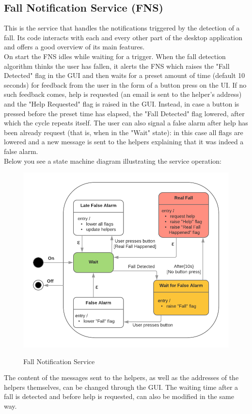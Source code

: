 \documentclass[hidelinks,conference,12pt]{IEEETran}
\begin{document}
\subsection{Fall Notification Service (FNS)}
This is the service that handles the notifications triggered by the detection of a fall. Its code interacts with each and every other part of the desktop application and offers a good overview of its main features.\\
On start the FNS idles while waiting for a trigger. When the fall detection algorithm thinks the user has fallen, it alerts the FNS which raises the "Fall Detected" flag in the GUI and then waits for a preset amount of time (default 10 seconds) for feedback from the user in the form of a button press on the UI. If no such feedback comes, help is requested (an email is sent to the helper’s address) and the "Help Requested" flag is raised in the GUI. Instead, in case a button is pressed before the preset time has elapsed, the "Fall Detected" flag lowered, after which the cycle repeats itself. The user can also signal a false alarm after help has been already request (that is, when in the "Wait" state): in this case all flags are lowered and a new message is sent to the helpers explaining that it was indeed a false alarm.\\
Below you see a state machine diagram illustrating the service operation:
\FloatBarrier
\begin{figure}[!h]
	\centering
	\caption{Fall Notification Service}
	\includegraphics[scale=0.3]{images/FNS.png}
	\label{img:FNS}
\end{figure}
\FloatBarrier
The content of the messages sent to the helpers, as well as the addresses of the helpers themselves, can be changed through the GUI. The waiting time after a fall is detected and before help is requested, can also be modified in the same way.
\end{document}
